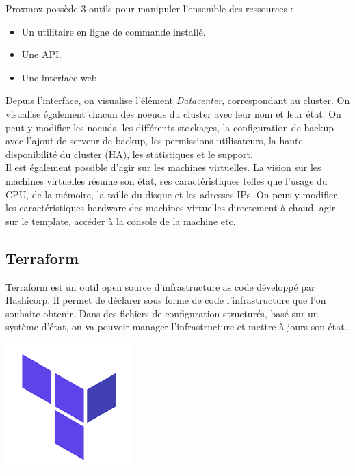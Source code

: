 \documentclass[12pt]{article}
\begin{document}
\begin{minipage}{.53\textwidth}%
Proxmox possède 3 outils pour manipuler l'ensemble des ressources :
 \begin{itemize}
     \item Un utilitaire en ligne de commande installé.
     \item Une API.
     \item Une interface web.
 \end{itemize}

Depuis l'interface, on visualise l'élément \textit{Datacenter}, correspondant au cluster. 
On visualise également chacun des noeuds du cluster avec leur nom et leur état. 
On peut y modifier les noeuds, les différents stockages, la configuration de backup avec l'ajout de serveur de backup, les permissions utilisateurs, la haute disponibilité du cluster (HA), les statistiques et le support. \\

Il est également possible d'agir sur les machines virtuelles. 
La vision sur les machines virtuelles résume son état, ses caractéristiques telles que l'usage du CPU, de la mémoire, la taille du disque et les adresses IPs. 
On peut y modifier les caractéristiques hardware des machines virtuelles directement à chaud, agir sur le template, accéder à la console de la machine etc. \\
\end{minipage}%

\newpage
\subsection{Terraform}
\noindent%
\begin{minipage}{.7\textwidth}%
Terraform est un outil open source d'infrastructure as code développé par Hashicorp. 
Il permet de déclarer sous forme de code l'infrastructure que l'on souhaite obtenir. 
Dans des fichiers de configuration structurés, basé sur un système d'état, on va pouvoir manager l'infrastructure et mettre à jours son état. \\

\end{minipage}%
\hfill
\begin{minipage}{.3\textwidth}%
\begin{center}
\includegraphics[scale=0.5]{src/Terraform.png}
\end{center}
\end{minipage}%
\end{document}
